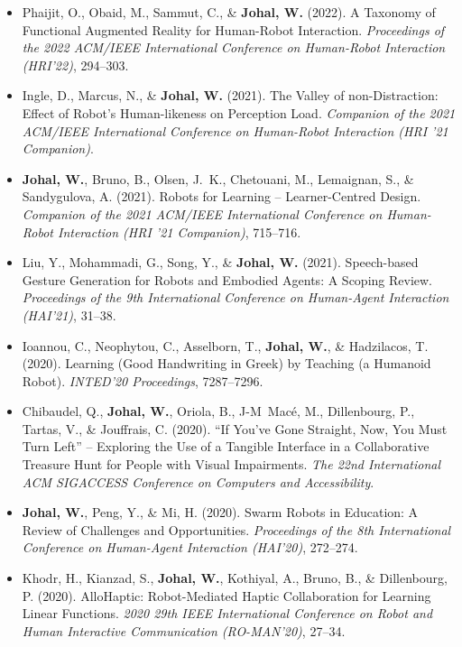 \begin{itemize}[nosep]
    \item Phaijit, O., Obaid, M., Sammut, C., \& \textbf{Johal, W.} (2022). A Taxonomy of Functional Augmented Reality for Human-Robot Interaction. \textit{Proceedings of the 2022 ACM/IEEE International Conference on Human-Robot Interaction (HRI'22)}, 294--303.

    \item Ingle, D., Marcus, N., \& \textbf{Johal, W.} (2021). The Valley of non-Distraction: Effect of Robot's Human-likeness on Perception Load. \textit{Companion of the 2021 ACM/IEEE International Conference on Human-Robot Interaction (HRI '21 Companion)}.

    \item \textbf{Johal, W.}, Bruno, B., Olsen, J.\ K., Chetouani, M., Lemaignan, S., \& Sandygulova, A. (2021). Robots for Learning -- Learner-Centred Design. \textit{Companion of the 2021 ACM/IEEE International Conference on Human-Robot Interaction (HRI '21 Companion)}, 715--716.

    \item Liu, Y., Mohammadi, G., Song, Y., \& \textbf{Johal, W.} (2021). Speech-based Gesture Generation for Robots and Embodied Agents: A Scoping Review. \textit{Proceedings of the 9th International Conference on Human-Agent Interaction (HAI'21)}, 31--38.

    \item Ioannou, C., Neophytou, C., Asselborn, T., \textbf{Johal, W.}, \& Hadzilacos, T. (2020). Learning (Good Handwriting in Greek) by Teaching (a Humanoid Robot). \textit{INTED'20 Proceedings}, 7287--7296.

    \item Chibaudel, Q., \textbf{Johal, W.}, Oriola, B., J-M\ Macé, M., Dillenbourg, P., Tartas, V., \& Jouffrais, C. (2020). ``If You've Gone Straight, Now, You Must Turn Left'' -- Exploring the Use of a Tangible Interface in a Collaborative Treasure Hunt for People with Visual Impairments. \textit{The 22nd International ACM SIGACCESS Conference on Computers and Accessibility}.

    \item \textbf{Johal, W.}, Peng, Y., \& Mi, H. (2020). Swarm Robots in Education: A Review of Challenges and Opportunities. \textit{Proceedings of the 8th International Conference on Human-Agent Interaction (HAI'20)}, 272--274.

    \item Khodr, H., Kianzad, S., \textbf{Johal, W.}, Kothiyal, A., Bruno, B., \& Dillenbourg, P. (2020). AlloHaptic: Robot-Mediated Haptic Collaboration for Learning Linear Functions. \textit{2020 29th IEEE International Conference on Robot and Human Interactive Communication (RO-MAN'20)}, 27--34.


\end{itemize}
